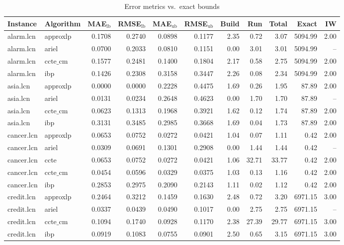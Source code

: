 \begin{table}[ht]
\centering
\scriptsize
\caption{Error metrics vs.\ exact bounds}
\begin{tabular}{llrrrrrrrrr}
\toprule
Instance & Algorithm & MAE$_{\text{lb}}$ & RMSE$_{\text{lb}}$ & MAE$_{\text{ub}}$ & RMSE$_{\text{ub}}$ & Build & Run & Total & Exact & IW \\
\midrule
alarm.lcn & approxlp & 0.1708 & 0.2740 & 0.0898 & 0.1177 & 2.35 & 0.72 & 3.07 & 5094.99 & 2.00 \\
alarm.lcn & ariel & 0.0700 & 0.2033 & 0.0810 & 0.1151 & 0.00 & 3.01 & 3.01 & 5094.99 & -- \\
alarm.lcn & $\text{ccte\_cm}$ & 0.1577 & 0.2481 & 0.1400 & 0.1804 & 2.17 & 0.58 & 2.75 & 5094.99 & 2.00 \\
alarm.lcn & ibp & 0.1426 & 0.2308 & 0.3158 & 0.3447 & 2.26 & 0.08 & 2.34 & 5094.99 & 2.00 \\
asia.lcn & approxlp & 0.0000 & 0.0000 & 0.2228 & 0.4475 & 1.69 & 0.26 & 1.95 & 87.89 & 2.00 \\
asia.lcn & ariel & 0.0131 & 0.0234 & 0.2648 & 0.4623 & 0.00 & 1.70 & 1.70 & 87.89 & -- \\
asia.lcn & $\text{ccte\_cm}$ & 0.0623 & 0.1313 & 0.1968 & 0.3921 & 1.62 & 0.12 & 1.74 & 87.89 & 2.00 \\
asia.lcn & ibp & 0.3131 & 0.3485 & 0.2985 & 0.3668 & 1.69 & 0.04 & 1.73 & 87.89 & 2.00 \\
cancer.lcn & approxlp & 0.0653 & 0.0752 & 0.0272 & 0.0421 & 1.04 & 0.07 & 1.11 & 0.42 & 2.00 \\
cancer.lcn & ariel & 0.0309 & 0.0691 & 0.1301 & 0.2908 & 0.00 & 1.44 & 1.44 & 0.42 & -- \\
cancer.lcn & ccte & 0.0653 & 0.0752 & 0.0272 & 0.0421 & 1.06 & 32.71 & 33.77 & 0.42 & 2.00 \\
cancer.lcn & $\text{ccte\_cm}$ & 0.0454 & 0.0596 & 0.0329 & 0.0375 & 1.03 & 0.13 & 1.16 & 0.42 & 2.00 \\
cancer.lcn & ibp & 0.2853 & 0.2975 & 0.2090 & 0.2143 & 1.11 & 0.02 & 1.12 & 0.42 & 2.00 \\
credit.lcn & approxlp & 0.2464 & 0.3212 & 0.1459 & 0.1630 & 2.48 & 0.72 & 3.20 & 6971.15 & 3.00 \\
credit.lcn & ariel & 0.0337 & 0.0439 & 0.0490 & 0.1017 & 0.00 & 2.75 & 2.75 & 6971.15 & -- \\
credit.lcn & $\text{ccte\_cm}$ & 0.1094 & 0.1740 & 0.0928 & 0.1170 & 2.38 & 27.39 & 29.77 & 6971.15 & 3.00 \\
credit.lcn & ibp & 0.0919 & 0.1083 & 0.0755 & 0.0901 & 2.50 & 0.65 & 3.15 & 6971.15 & 3.00 \\

\end{tabular}
\end{table}
